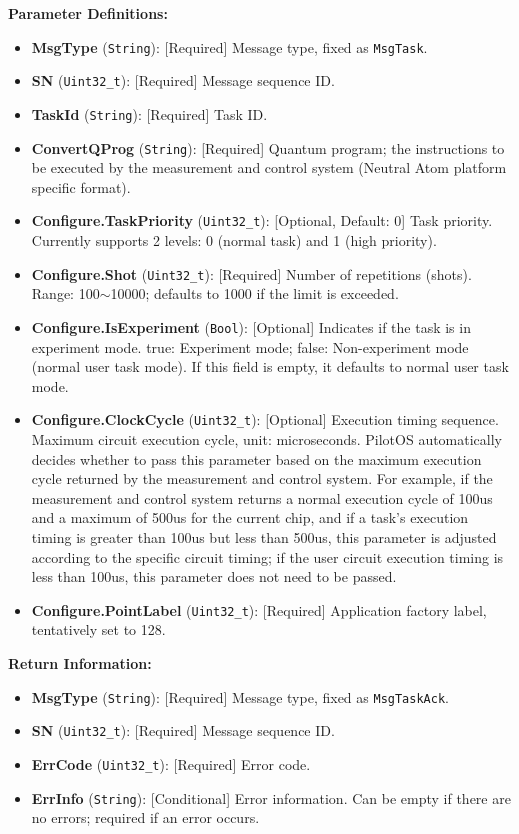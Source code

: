 \documentclass[12pt, a4paper]{article}
\begin{document}
\textbf{Parameter Definitions:}
\begin{itemize}
    \item \textbf{MsgType} (\texttt{String}): [Required] Message type, fixed as \texttt{MsgTask}.
    \item \textbf{SN} (\texttt{Uint32\_t}): [Required] Message sequence ID.
    \item \textbf{TaskId} (\texttt{String}): [Required] Task ID.
    \item \textbf{ConvertQProg} (\texttt{String}): [Required] Quantum program; the instructions to be executed by the measurement and control system (Neutral Atom platform specific format).
    \item \textbf{Configure.TaskPriority} (\texttt{Uint32\_t}): [Optional, Default: 0] Task priority. Currently supports 2 levels: 0 (normal task) and 1 (high priority).
    \item \textbf{Configure.Shot} (\texttt{Uint32\_t}): [Required] Number of repetitions (shots). Range: 100$\sim$10000; defaults to 1000 if the limit is exceeded.
    \item \textbf{Configure.IsExperiment} (\texttt{Bool}): [Optional] Indicates if the task is in experiment mode. true: Experiment mode; false: Non-experiment mode (normal user task mode). If this field is empty, it defaults to normal user task mode.
    \item \textbf{Configure.ClockCycle} (\texttt{Uint32\_t}): [Optional] Execution timing sequence. Maximum circuit execution cycle, unit: microseconds. PilotOS automatically decides whether to pass this parameter based on the maximum execution cycle returned by the measurement and control system. For example, if the measurement and control system returns a normal execution cycle of 100us and a maximum of 500us for the current chip, and if a task's execution timing is greater than 100us but less than 500us, this parameter is adjusted according to the specific circuit timing; if the user circuit execution timing is less than 100us, this parameter does not need to be passed.
    \item \textbf{Configure.PointLabel} (\texttt{Uint32\_t}): [Required] Application factory label, tentatively set to 128.
\end{itemize}

\textbf{Return Information:}
\begin{itemize}
    \item \textbf{MsgType} (\texttt{String}): [Required] Message type, fixed as \texttt{MsgTaskAck}.
    \item \textbf{SN} (\texttt{Uint32\_t}): [Required] Message sequence ID.
    \item \textbf{ErrCode} (\texttt{Uint32\_t}): [Required] Error code.
    \item \textbf{ErrInfo} (\texttt{String}): [Conditional] Error information. Can be empty if there are no errors; required if an error occurs.
\end{itemize}
\end{document}
